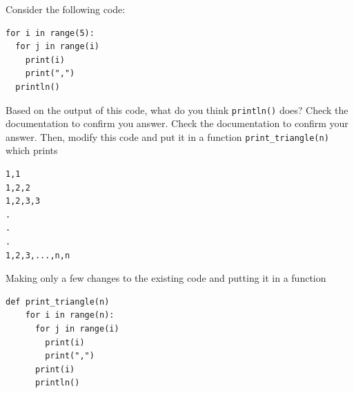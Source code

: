 \begin{exercise}
Consider the following code: 
\begin{Verbatim}
for i in range(5):
  for j in range(i)
    print(i)
    print(",")
  println()
\end{Verbatim}
Based on the output of this code, what do you think \verb|println()| does? Check the documentation to confirm you answer. Check the documentation to confirm your answer. 
Then, modify this code and put it in a function \verb|print_triangle(n)| which prints 
\begin{Verbatim}
1,1
1,2,2
1,2,3,3
.
.
.
1,2,3,...,n,n
\end{Verbatim}
\end{exercise}
\begin{solution}
Making only a few changes to the existing code and putting it in a function 
\begin{Verbatim}
def print_triangle(n)
    for i in range(n):
      for j in range(i)
        print(i)
        print(",")
      print(i)
      println()
\end{Verbatim}
\end{solution}
%



